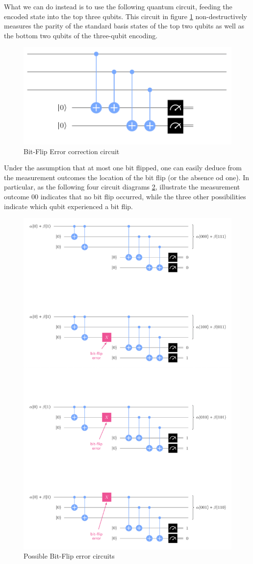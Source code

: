 \documentclass[12pt, oneside]{book}
\theoremstyle{definition}
\theoremstyle{definition}
\theoremstyle{remark}
\begin{document}
What we can do instead is to use the following quantum circuit, feeding the encoded state into the top three qubits. This circuit in figure \ref{fig:bitfliperr} non-destructively measures the parity of the standard basis states of the top two qubits as well as the bottom two qubits of the three-qubit encoding.
\begin{figure}[ht]
    \centering
    \includegraphics[width=1\linewidth]{../images/possbitflipcircs.png}
    \caption{Bit-Flip Error correction circuit}
    \label{fig:bitfliperr}
\end{figure}
Under the assumption that at most one bit flipped, one can easily deduce from the measurement outcomes the location of the bit flip (or the absence od one). In particular, as the following four circuit diagrams \ref{fig:possbitflip}, illustrate the measurement outcome $00$ indicates that no bit flip occurred, while the three other possibilities indicate which qubit experienced a bit flip.
\begin{figure}[ht]
    \centering
    \includegraphics[width=0.75\linewidth]{../images/possbitflip.png}
    \caption{Possible Bit-Flip error circuits}
    \label{fig:possbitflip}
\end{figure}
\end{document}
